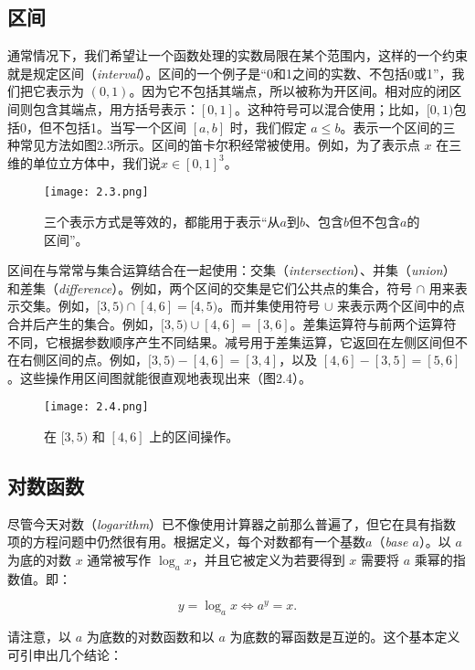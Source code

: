 \documentclass[lang=cn,12pt]{elegantbook}
\begin{document}
\subsection{区间}

通常情况下，我们希望让一个函数处理的实数局限在某个范围内，这样的一个约束就是规定区间（\textit{interval}）。区间的一个例子是“0和1之间的实数、不包括0或1”，我们把它表示为 $(0,1)$。因为它不包括其端点，所以被称为开区间。相对应的闭区间则包含其端点，用方括号表示：$[0,1]$。这种符号可以混合使用；比如，$[0,1)$包括0，但不包括1。当写一个区间 $[a,b]$ 时，我们假定 $a \leq b$。表示一个区间的三种常见方法如图2.3所示。区间的笛卡尔积经常被使用。例如，为了表示点 $x$ 在三维的单位立方体中，我们说$x \in [0, 1]^3$。

\begin{figure}[htbp]
\centering
\texttt{[image: 2.3.png]}
\caption{三个表示方式是等效的，都能用于表示“从$a$到$b$、包含$b$但不包含$a$的区间”。}
\end{figure}

区间在与常常与集合运算结合在一起使用：交集（\textit{intersection}）、并集（\textit{union}）和差集（\textit{difference}）。例如，两个区间的交集是它们公共点的集合，符号 $\cap$ 用来表示交集。例如，$[3,5) \cap [4,6] = [4,5)$。而并集使用符号 $\cup$ 来表示两个区间中的点合并后产生的集合。例如，$[3,5) \cup [4,6] = [3,6]$。差集运算符与前两个运算符不同，它根据参数顺序产生不同结果。减号用于差集运算，它返回在左侧区间但不在右侧区间的点。例如，$[3,5) - [4,6] = [3,4]$，以及 $[4,6] - [3,5] = [5,6]$。这些操作用区间图就能很直观地表现出来（图2.4）。

\begin{figure}[htbp]
\centering
\texttt{[image: 2.4.png]}
\caption{在 $[3,5)$ 和 $[4,6]$ 上的区间操作。}
\end{figure}

\subsection{对数函数}

尽管今天对数（\textit{logarithm}）已不像使用计算器之前那么普遍了，但它在具有指数项的方程问题中仍然很有用。根据定义，每个对数都有一个基数$a$（\textit{base $a$}）。以 $a$ 为底的对数 $x$ 通常被写作 $\log_ax$，并且它被定义为若要得到 $x$ 需要将 $a$ 乘幂的指数值。即：

$$
y = \log_ax \iff a^y = x.
$$

请注意，以 $a$ 为底数的对数函数和以 $a$ 为底数的幂函数是互逆的。这个基本定义可引申出几个结论：
\end{document}
